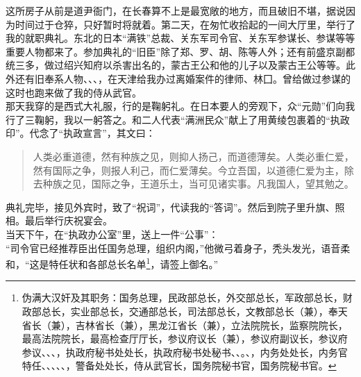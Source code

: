 这所房子从前是道尹衙门，在长春算不上是最宽敞的地方，而且破旧不堪，据说因为时间过于仓猝，只好暂时将就着。第二天，在匆忙收拾起的一间大厅里，举行了我的就职典礼。东北的日本“满铁”总裁、关东军司令官、关东军参谋长、参谋等等重要人物都来了。参加典礼的“旧臣”除了郑、罗、胡、陈等人外；还有前盛京副都统三多，做过绍兴知府以杀害出名的，蒙古王公和他的儿子以及蒙古王公等等。此外还有旧奉系人物、、、，在天津给我办过离婚案件的律师、林囗。曾给做过参谋的这时也跑来做了我的侍从武官。\\

那天我穿的是西式大礼服，行的是鞠躬礼。在日本要人的旁观下，众“元勋”们向我行了三鞠躬，我以一躬答之。和二人代表“满洲民众”献上了用黄绫包裹着的“执政印”。代念了“执政宣言”，其文曰：\\

\begin{quote}
	人类必重道德，然有种族之见，则抑人扬己，而道德薄矣。人类必重仁爱，然有国际之争，则报人利己，而仁爱薄矣。今立吾国，以道德仁爱为主，除去种族之见，国际之争，王道乐土，当可见诸实事。凡我国人，望其勉之。\\
\end{quote}

典礼完毕，接见外宾时，致了“祝词”，代读我的“答词”。然后到院子里升旗、照相。最后举行庆祝宴会。\\

当天下午，在“执政办公室”里，送上一件“公事”：\\

“司令官已经推荐臣出任国务总理，组织内阁，”他微弓着身子，秃头发光，语音柔和，“这是特任状和各部总长名单\footnote{伪满大汉奸及其职务：国务总理，民政部总长，外交部总长，军政部总长，财政部总长，实业部总长，交通部总长，司法部总长，文教部总长（兼），奉天省长（兼），吉林省长（兼），黑龙江省长（兼），立法院院长，监察院院长，最高法院院长，最高检查厅厅长，参议府议长（兼），参议府副议长，参议府参议、、、，执政府秘书处处长，执政府秘书处秘书、、。、，内务处处长，内务官特任、、、、、，警备处处长，侍从武官长，国务院秘书官，国务院秘书官。}，请签上御名。”\\

